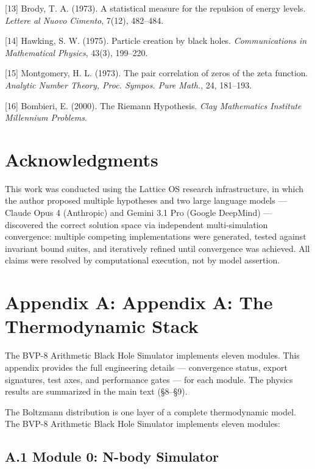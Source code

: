 \documentclass[
  11pt,
]{article}
\numberwithin{equation}{section}
\begin{document}
{[}13{]} Brody, T. A. (1973). A statistical measure for the repulsion of
energy levels. \emph{Lettere al Nuovo Cimento}, 7(12), 482--484.

{[}14{]} Hawking, S. W. (1975). Particle creation by black holes.
\emph{Communications in Mathematical Physics}, 43(3), 199--220.

{[}15{]} Montgomery, H. L. (1973). The pair correlation of zeros of the
zeta function. \emph{Analytic Number Theory, Proc. Sympos. Pure Math.},
24, 181--193.

{[}16{]} Bombieri, E. (2000). The Riemann Hypothesis. \emph{Clay
Mathematics Institute Millennium Problems}.



\section{Acknowledgments}\label{acknowledgments}

This work was conducted using the Lattice OS research infrastructure, in
which the author proposed multiple hypotheses and two large language
models --- Claude Opus 4 (Anthropic) and Gemini 3.1 Pro (Google
DeepMind) --- discovered the correct solution space via independent
multi-simulation convergence: multiple competing implementations were
generated, tested against invariant bound suites, and iteratively
refined until convergence was achieved. All claims were resolved by
computational execution, not by model assertion.



\section{Appendix A: Appendix A: The Thermodynamic
Stack}\label{appendix-a-the-thermodynamic-stack}

The BVP-8 Arithmetic Black Hole Simulator implements eleven modules.
This appendix provides the full engineering details --- convergence
status, export signatures, test axes, and performance gates --- for each
module. The physics results are summarized in the main text (§8--§9).

The Boltzmann distribution is one layer of a complete thermodynamic
model. The BVP-8 Arithmetic Black Hole Simulator implements eleven
modules:

\subsection{A.1 Module 0: N-body
Simulator}\label{a.1-module-0-n-body-simulator}
\end{document}
